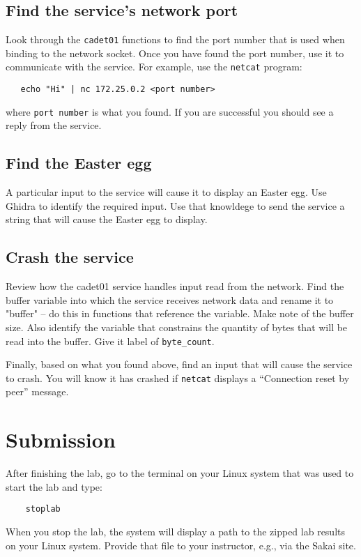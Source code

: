 \subsection{Find the service's network port}
Look through the {\tt cadet01} functions to find the port number that is used when binding to the network socket.
Once you have found the port number, use it to communicate with the service.  For example, use the {\tt netcat} program:
\begin{verbatim}
   echo "Hi" | nc 172.25.0.2 <port number>
\end{verbatim}
\noindent where {\tt port number} is what you found.  If you are successful you should see a reply from the service.

\subsection{Find the Easter egg}
A particular input to the service will cause it to display an Easter egg.  Use Ghidra to identify the required input.
Use that knowldege to send the service a string that will cause the Easter egg to display.

\subsection{Crash the service}
Review how the {cadet01} service handles input read from the network.  Find the buffer variable into which the service receives
network data and rename it to "buffer" -- do this in functions that reference the variable.  Make note of the buffer size.
Also identify the variable that 
constrains the quantity of bytes that will be read into the buffer.  Give it label of {\tt byte\_count}.

Finally, based on what you found above, find an input that will cause the service to crash.
You will know it has crashed if {\tt netcat} displays a ``Connection reset by peer'' message.

\section{Submission}
After finishing the lab, go to the terminal on your Linux system that was used to start the lab and type:
\begin{verbatim}
    stoplab 
\end{verbatim}
When you stop the lab, the system will display a path to the zipped lab results on your Linux system.  Provide that file to 
your instructor, e.g., via the Sakai site.

\copyrightnotice


